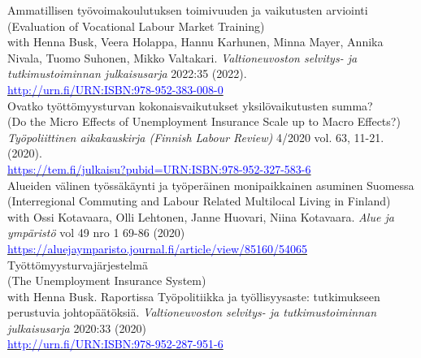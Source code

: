 \documentclass[16pt]{article}
\begin{document}
\noindent Ammatillisen ty\"{o}voimakoulutuksen toimivuuden ja vaikutusten arviointi \\
\noindent (Evaluation of Vocational Labour Market Training) \\
\noindent with Henna Busk, Veera Holappa, Hannu Karhunen, Minna Mayer, Annika Nivala, Tuomo Suhonen, Mikko Valtakari.  \textit{Valtioneuvoston selvitys- ja tutkimustoiminnan julkaisusarja} 2022:35 (2022).  \\
\noindent \href{http://urn.fi/URN:ISBN:978-952-383-008-0}{\textcolor{blue}{http://urn.fi/URN:ISBN:978-952-383-008-0}} \\

\noindent Ovatko ty\"{o}tt\"{o}myysturvan kokonaisvaikutukset yksil\"{o}vaikutusten summa? \\
\noindent (Do the Micro Effects of Unemployment Insurance Scale up to Macro Effects?) \\
\noindent  \textit{Ty\"{o}poliittinen aikakauskirja (Finnish Labour Review)} 4/2020 vol. 63, 11-21.  (2020). \\
\noindent  \href{https://tem.fi/julkaisu?pubid=URN:ISBN:978-952-327-583-6} {\textcolor{blue}{https://tem.fi/julkaisu?pubid=URN:ISBN:978-952-327-583-6}}\\

\noindent Alueiden v\"{a}linen ty\"{o}ss\"{a}k\"{a}ynti ja ty\"{o}per\"{a}inen monipaikkainen asuminen Suomessa \\
\noindent (Interregional Commuting and Labour Related Multilocal Living in Finland) \\
\noindent with Ossi Kotavaara, Olli Lehtonen, Janne Huovari, Niina Kotavaara. \textit{Alue ja ympäristö} vol 49 nro 1 69-86 (2020) \\
\noindent  \href{https://aluejaymparisto.journal.fi/article/view/85160/54065}{\textcolor{blue}{https://aluejaymparisto.journal.fi/article/view/85160/54065}} \\
 
\noindent Ty\"{o}tt\"{o}myysturvaj\"{a}rjestelm\"{a} \\
\noindent (The Unemployment Insurance System) \\
\noindent with Henna Busk. Raportissa Ty\"{o}politiikka ja ty\"{o}llisyysaste: tutkimukseen perustuvia johtop\"{a}\"{a}t\"{o}ksi\"{a}. \textit{Valtioneuvoston selvitys- ja tutkimustoiminnan julkaisusarja} 2020:33 (2020) \\
\noindent  \href{http://urn.fi/URN:ISBN:978-952-287-951-6}{\textcolor{blue}{http://urn.fi/URN:ISBN:978-952-287-951-6}} \\
\end{document}
